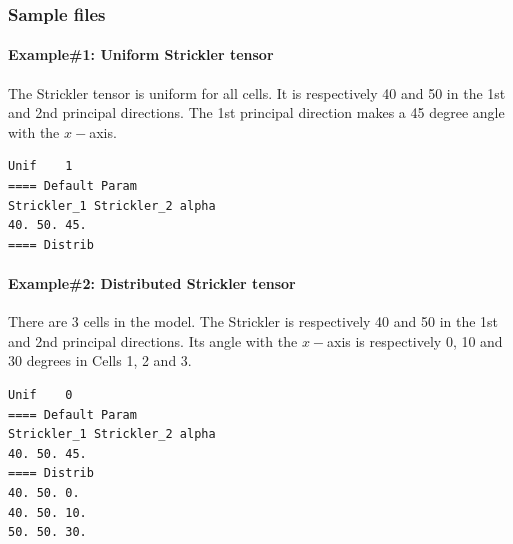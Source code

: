 \subsubsection{Sample files}
%
\paragraph*{Example\#1: Uniform Strickler tensor}
The Strickler tensor is uniform for all cells. It is respectively 40 and 50 in the 1st and 2nd principal directions. The 1st principal direction makes a 45 degree angle with the $x-$axis.
\begin{verbatim}
Unif	1
==== Default Param
Strickler_1	Strickler_2	alpha
40.	50.	45.
==== Distrib
\end{verbatim}
%
\paragraph*{Example\#2: Distributed Strickler tensor}
There are 3 cells in the model. The Strickler is respectively 40 and 50 in the 1st and 2nd principal directions. Its angle with the $x-$axis is respectively 0, 10 and 30 degrees in Cells 1, 2 and 3.
\begin{verbatim}
Unif	0
==== Default Param
Strickler_1	Strickler_2	alpha
40.	50.	45.
==== Distrib
40.	50.	0.
40.	50.	10.
50.	50.	30.
\end{verbatim}